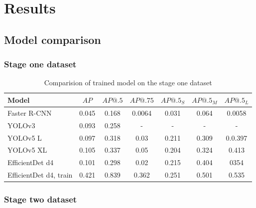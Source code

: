 \chapter{Results}
\label{chapter:results}
\section{Model comparison}
\subsection{Stage one dataset}
\begin{table}
    \centering
    \begin{tabular}{l|c|c|c|c|c|c}
        Model                  & $AP$  & $AP@.5$ & $AP@.75$ & $AP@.5_S$ & $AP@.5_M$ & $AP@.5_L$ \\ \hline
        Faster R-CNN           & 0.045 & 0.168   & 0.0064   & 0.031     & 0.064     & 0.0058    \\ \hline
        YOLOv3                 & 0.093 & 0.258   & -        & -         & -         & -         \\ \hline
        YOLOv5 L               & 0.097 & 0.318   & 0.03     & 0.211     & 0.309     & 0.0.397   \\ \hline
        YOLOv5 XL              & 0.105 & 0.337   & 0.05     & 0.204     & 0.324     & 0.413     \\ \hline
        EfficientDet d4        & 0.101 & 0.298   & 0.02     & 0.215     & 0.404     & 0354      \\ \hline
        EfficientDet d4, train & 0.421 & 0.839   & 0.362    & 0.251     & 0.501     & 0.535     \\ \hline
    \end{tabular}
    \caption{Comparision of trained model on the stage one dataset}
    \label{tab:model_results:stage_one}
\end{table}

\subsection{Stage two dataset}


